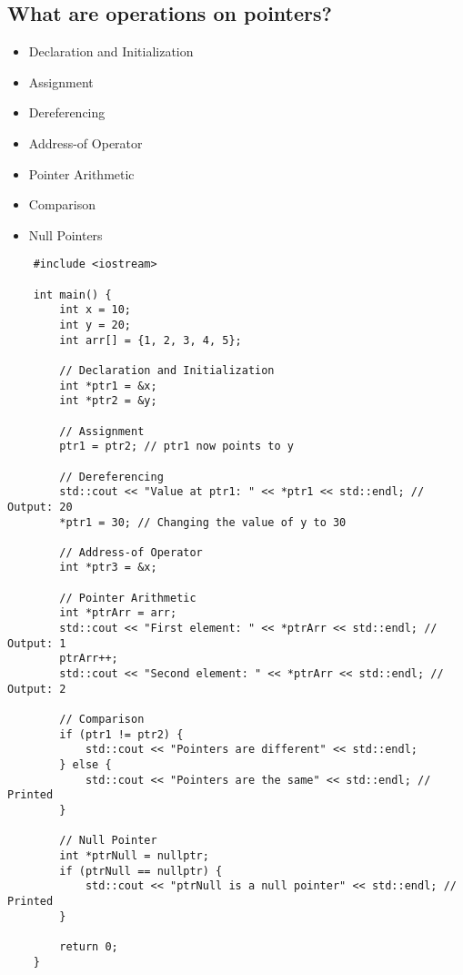 \subsection{What are operations on pointers?}
\begin{itemize}
    \item Declaration and Initialization
    \item Assignment
    \item Dereferencing
    \item Address-of Operator
    \item Pointer Arithmetic
    \item Comparison
    \item Null Pointers
\end{itemize}
\begin{tcolorbox}[title=Operations on Pointers]
    \begin{verbatim}
    #include <iostream>

    int main() {
        int x = 10;
        int y = 20;
        int arr[] = {1, 2, 3, 4, 5};
    
        // Declaration and Initialization
        int *ptr1 = &x;
        int *ptr2 = &y;
    
        // Assignment
        ptr1 = ptr2; // ptr1 now points to y
    
        // Dereferencing
        std::cout << "Value at ptr1: " << *ptr1 << std::endl; // Output: 20
        *ptr1 = 30; // Changing the value of y to 30
    
        // Address-of Operator
        int *ptr3 = &x;
    
        // Pointer Arithmetic
        int *ptrArr = arr;
        std::cout << "First element: " << *ptrArr << std::endl; // Output: 1
        ptrArr++;
        std::cout << "Second element: " << *ptrArr << std::endl; // Output: 2
    
        // Comparison
        if (ptr1 != ptr2) {
            std::cout << "Pointers are different" << std::endl;
        } else {
            std::cout << "Pointers are the same" << std::endl; // Printed
        }
    
        // Null Pointer
        int *ptrNull = nullptr;
        if (ptrNull == nullptr) {
            std::cout << "ptrNull is a null pointer" << std::endl; // Printed
        }
    
        return 0;
    }        
    \end{verbatim}
\end{tcolorbox}

